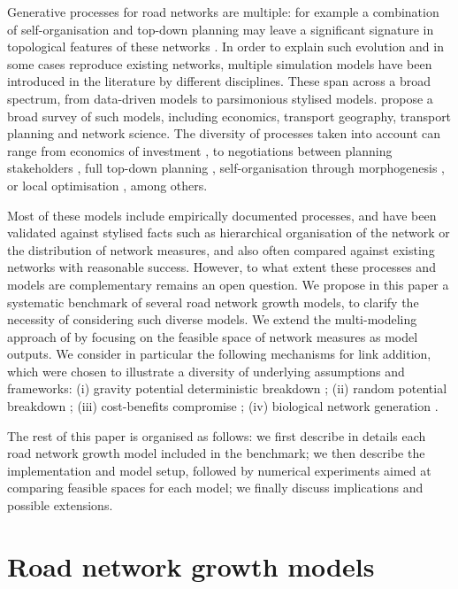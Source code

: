 \documentclass{article}
\begin{document}
Generative processes for road networks are multiple: for example a combination of self-organisation and top-down planning may leave a significant signature in topological features of these networks \cite{barthelemy2013self}. In order to explain such evolution and in some cases reproduce existing networks, multiple simulation models have been introduced in the literature by different disciplines. These span across a broad spectrum, from data-driven models to parsimonious stylised models. \cite{xie2009modeling} propose a broad survey of such models, including economics, transport geography, transport planning and network science. The diversity of processes taken into account can range from economics of investment \cite{xie2011evolving}, to negotiations between planning stakeholders \cite{raimbault2021introducing}, full top-down planning \cite{szell2021growing}, self-organisation through morphogenesis \cite{tirico2018morphogenesis}, or local optimisation \cite{barthelemy2009co}, among others.

Most of these models include empirically documented processes, and have been validated against stylised facts such as hierarchical organisation of the network or the distribution of network measures, and also often compared against existing networks with reasonable success. However, to what extent these processes and models are complementary remains an open question. We propose in this paper a systematic benchmark of several road network growth models, to clarify the necessity of considering such diverse models. We extend the multi-modeling approach of \cite{raimbault2018multi} by focusing on the feasible space of network measures as model outputs. We consider in particular the following mechanisms for link addition, which were chosen to illustrate a diversity of underlying assumptions and frameworks: (i) gravity potential deterministic breakdown \cite{raimbault2019second}; (ii) random potential breakdown \cite{raimbault2020unveiling}; (iii) cost-benefits compromise  \cite{louf2013emergence}; (iv) biological network generation  \cite{raimbault2018systemes}.

The rest of this paper is organised as follows: we first describe in details each road network growth model included in the benchmark; we then describe the implementation and model setup, followed by numerical experiments aimed at comparing feasible spaces for each model; we finally discuss implications and possible extensions.



\section{Road network growth models}
\end{document}
